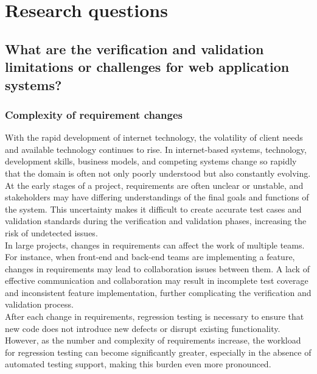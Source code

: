 \documentclass[a4paper, 11pt]{article}  %
\begin{document}
\section{Research questions}
\subsection{What are the verification and validation limitations or challenges for web application systems?}
\subsubsection{Complexity of requirement changes}
\vspace{0.25cm} %
With the rapid development of internet technology, the volatility of client needs and available technology continues to rise. In internet-based systems, technology, development skills, business models, and competing systems change so rapidly that the domain is often not only poorly understood but also constantly evolving\cite{lowe2003web}.\\
At the early stages of a project, requirements are often unclear or unstable, and stakeholders may have differing understandings of the final goals and functions of the system. This uncertainty makes it difficult to create accurate test cases and validation standards during the verification and validation phases, increasing the risk of undetected issues.\\
In large projects, changes in requirements can affect the work of multiple teams. For instance, when front-end and back-end teams are implementing a feature, changes in requirements may lead to collaboration issues between them. A lack of effective communication and collaboration may result in incomplete test coverage and inconsistent feature implementation, further complicating the verification and validation process.\\
After each change in requirements, regression testing is necessary to ensure that new code does not introduce new defects or disrupt existing functionality. However, as the number and complexity of requirements increase, the workload for regression testing can become significantly greater, especially in the absence of automated testing support, making this burden even more pronounced.
\end{document}
